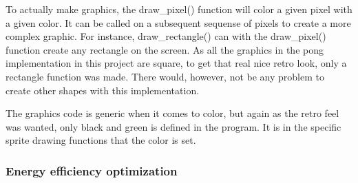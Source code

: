 To actually make graphics, the draw\_pixel() function will color a given pixel
with a given color.  It can be called on a subsequent sequense of pixels to
create a more complex graphic.  For instance, draw\_rectangle() can with the
draw\_pixel() function create any rectangle on the screen.  As all the graphics in
the pong implementation in this project are square, to get that real nice retro
look, only a rectangle function was made.  There would, however, not be any
problem to create other shapes with this implementation.

The graphics code is generic when it comes to color, but again as the retro feel
was wanted, only black and green is defined in the program.  It is in the
specific sprite drawing functions that the color is set.

\subsubsection{Energy efficiency optimization}
